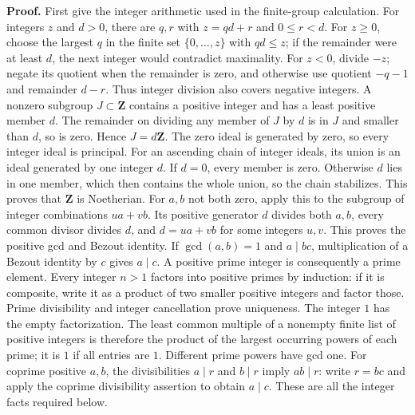 \documentclass[11pt,a4paper,openany]{report}
\newcounter{none}
\begin{document}
\textbf{Proof.} First give the integer arithmetic used in the finite-group calculation. For integers \(z\) and \(d>0\), there are \(q,r\) with \(z=qd+r\) and \(0\le r<d\). For \(z\ge0\), choose the largest \(q\) in the finite set \(\{0,\ldots,z\}\) with \(qd\le z\); if the remainder were at least \(d\), the next integer would contradict maximality. For \(z<0\), divide \(-z\); negate its quotient when the remainder is zero, and otherwise use quotient \(-q-1\) and remainder \(d-r\). Thus integer division also covers negative integers. A nonzero subgroup \(J\subset\mathbf Z\) contains a positive integer and has a least positive member \(d\). The remainder on dividing any member of \(J\) by \(d\) is in \(J\) and smaller than \(d\), so is zero. Hence \(J=d\mathbf Z\). The zero ideal is generated by zero, so every integer ideal is principal. For an ascending chain of integer ideals, its union is an ideal generated by one integer \(d\). If \(d=0\), every member is zero. Otherwise \(d\) lies in one member, which then contains the whole union, so the chain stabilizes. This proves that \(\mathbf Z\) is Noetherian. For \(a,b\) not both zero, apply this to the subgroup of integer combinations \(ua+vb\). Its positive generator \(d\) divides both \(a,b\), every common divisor divides \(d\), and \(d=ua+vb\) for some integers \(u,v\). This proves the positive gcd and Bezout identity. If \(\gcd(a,b)=1\) and \(a\mid bc\), multiplication of a Bezout identity by \(c\) gives \(a\mid c\). A positive prime integer is consequently a prime element. Every integer \(n>1\) factors into positive primes by induction: if it is composite, write it as a product of two smaller positive integers and factor those. Prime divisibility and integer cancellation prove uniqueness. The integer \(1\) has the empty factorization. The least common multiple of a nonempty finite list of positive integers is therefore the product of the largest occurring powers of each prime; it is \(1\) if all entries are \(1\). Different prime powers have gcd one. For coprime positive \(a,b\), the divisibilities \(a\mid r\) and \(b\mid r\) imply \(ab\mid r\): write \(r=bc\) and apply the coprime divisibility assertion to obtain \(a\mid c\). These are all the integer facts required below.
\end{document}
